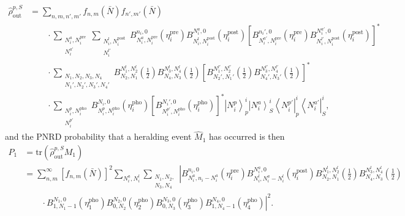 \documentclass[aps,twocolumn,secnumarabic,amsmath,amssymb,pra,groupedaddress,
showpacs, showkeys]{revtex4-1}
\newcommand{\bra}[1]{\left\langle #1 \right|}
\newcommand{\ket}[1]{\left|#1\right\rangle}
\newcommand{\pna}[1]{\left(#1\right)}
\newcommand{\pnb}[1]{\left[#1\right]}
\begin{document}
\begin{align}
	\hat{\rho}_{\textrm{out}}^{p,S} & = \sum_{n,m,n',m'} f_{n,m}\pna{\bar{N}} f_{n',m'}\pna{\bar{N}} \nonumber \\
	& \qquad \cdot\sum_{\substack{N_i^a,N_i^{\textrm{pre}}\\ N_i^{a\prime} }} \sum_{\substack{N_i^l,N_i^{\textrm{post}}\\ N_i^{l\prime} }}
	B_{N_i^a,N_i^{\textrm{pre}}}^{n_i,0}\pna{\eta_i^{\textrm{pre}}} B_{N_i^l,N_i^{\textrm{post}}}^{N_i^a,0}\pna{\eta_i^{\textrm{post}}} \pnb{B_{N_i^{a\prime},N_i^{\textrm{pre}}}^{n_i',0}\pna{\eta_i^{\textrm{pre}}} B_{N_i^{l\prime},N_i^{\textrm{post}}}^{N_i^{a\prime},0}\pna{\eta_i^{\textrm{post}}}}^{*} \nonumber \\
	& \qquad \cdot \sum_{\substack{N_1,N_2,N_3,N_4\\ N_1',N_2',N_3',N_4'}}
	 B_{N_2,N_1}^{N_1^l,N_2^l}\pna{\frac{1}{2}} B_{N_4,N_3}^{N_3^l,N_4^l}\pna{\frac{1}{2}} \pnb{B_{N_2',N_1'}^{N_1^{l\prime},N_2^{l\prime}}\pna{\frac{1}{2}} B_{N_4',N_3'}^{N_3^{l\prime},N_4^{l\prime}}\pna{\frac{1}{2}}}^{*}\nonumber \\
	& \qquad \cdot \sum_{\substack{N_i^p,N_i^{\textrm{pho}}\\ N_i^{p\prime} }}
	 B_{N_i^p,N_i^{\textrm{pho}}}^{N_i,0}\pna{\eta_i^{\textrm{pho}}} \pnb{B_{N_i^{p\prime},N_i^{\textrm{pho}}}^{N_i',0}\pna{\eta_i^{\textrm{pho}}}}^{*} \ket{N_i^p}_{p}^i \ket{N_i^a}_{S}^i \bra{N_i^{p\prime}}_{p}^i \bra{N_i^{a\prime}}_{S}^i,
\end{align}
and the PNRD probability that a heralding event $\hat{M}_{1}$ has occurred is then
\begin{align}
	P_{1}& =\textrm{tr}\pna{\hat{\rho}_{\textrm{out}}^{p,S} M_{1}}\nonumber \\
	& = \sum_{n,m}^{\infty} \pnb{f_{n,m}\pna{\bar{N}} }^2 \sum_{N_i^a,N_i^l} \sum_{\substack{N_1,N_2,\\N_3,N_4}} \left|B_{N_i^a,n_i-N_i^a}^{n_i,0}\pna{\eta_i^{\textrm{pre}}}  
	B_{N_i^l,N_i^a-N_i^l}^{N_i^a,0}\pna{\eta_i^{\textrm{post}}}  B_{N_2,N_1}^{N_1^l,N_2^l}\pna{\frac{1}{2}} B_{N_4,N_3}^{N_3^l,N_4^l}\pna{\frac{1}{2}}\right.\nonumber \\
	& \left.\qquad \cdot B_{1,N_1-1}^{N_1,0}\pna{\eta_1^{\textrm{pho}}}
	 		B_{0,N_2}^{N_2,0}\pna{\eta_2^{\textrm{pho}}}
	 		B_{0,N_3}^{N_3,0}\pna{\eta_3^{\textrm{pho}}}
			B_{1,N_4-1}^{N_4,0}\pna{\eta_4^{\textrm{pho}}}\right|^2.
\end{align}
\end{document}
